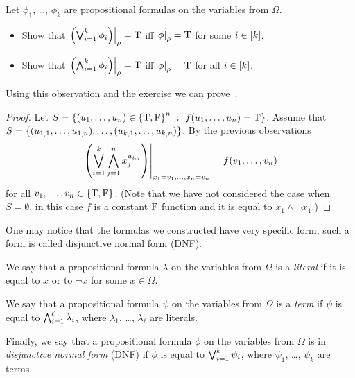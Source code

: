 \begin{exercise}
  Let $\phi_1$, \dots, $\phi_k$ are propositional formulas
  on the variables from $\Omega$.
  \begin{itemize}
    \item Show that
      $\left. {\left(\bigvee_{i = 1}^k \phi_i\right)} \right\rvert_{\rho} = \text{T}$ iff
      $\left. {\phi} \right\rvert_{\rho} = \text{T}$ for some $i \in [{k}]$.
    \item Show that
      $\left. {\left(\bigwedge_{i = 1}^k \phi_i\right)} \right\rvert_{\rho} = \text{T}$ iff
      $\left. {\phi} \right\rvert_{\rho} = \text{T}$ for all $i \in [{k}]$.
  \end{itemize}
\end{exercise}

Using this observation and the exercise we can
prove~.
\begin{proof}
  Let $S = \set[f(u_1, \dots, u_n) = \ltrue]{(u_1, \dots, u_n) \in
    \set{\ltrue, \lfalse}^n}$.
  Assume that
  $S = \set{(u_{1, 1}, \dots, u_{1, n}), \dots, (u_{k, 1}, \dots, u_{k, n})}$.
  By the previous observations
  \[
    \left. {
      \left(
        \bigvee_{i = 1}^k
          \bigwedge_{j = 1}^n x_j^{u_{i, j}}
      \right)
    } \right\rvert_{x_1 = v_1, \dots, x_n = v_n}
    =
    f(v_1, \dots, v_n)
  \]
  for all $v_1, \dots, v_n \in \set{\ltrue, \lfalse}$.
  (Note that we have not considered the case when $S = \emptyset$, in this
  case $f$ is a constant $\text{F}$ function and it is equal to
  $x_1 \land \lnot x_1$.)
\end{proof}

One may notice that the formulas we constructed have very specific form,
such a form is called disjunctive normal form (DNF).
\begin{definition}
  We say that a propositional formula $\lambda$ on the variables from $\Omega$
  is a \emph{literal} if it is equal to $x$ or to $\lnot x$ for some
  $x \in \Omega$.

  We say that a propositional formula $\psi$ on the variables from $\Omega$ is
  a \emph{term} if $\psi$ is equal to $\bigwedge_{i = 1}^\ell \lambda_i$, where $\lambda_1$, \dots, $\lambda_\ell$ are literals.

  Finally, we say that a propositional formula $\phi$ on the variables from
  $\Omega$ is in \emph{disjunctive normal form} (DNF) if $\phi$ is equal to
  $\bigvee_{i = 1}^k \psi_i$, where $\psi_1$, \dots, $\psi_k$ are
  terms.
\end{definition}

